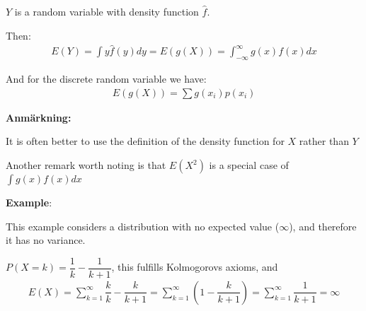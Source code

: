 \par\bigskip
\noindent $Y$ is a random variable with density function $\hat{f}$.\par
\noindent Then:
\begin{equation*}
  \begin{gathered}
    E(Y) = \int y \hat{f}(y)dy = E(g(X)) = \int_{-\infty}^{\infty}g(x)f(x)dx
  \end{gathered}
\end{equation*}
\par\bigskip
\noindent And for the discrete random variable we have:
\begin{equation*}
  \begin{gathered}
    E(g(X)) = \sum g(x_i)p(x_i)
  \end{gathered}
\end{equation*}
\par\bigskip
\noindent\textbf{Anmärkning:}\par
\noindent It is often better to use the definition of the density function for $X$ rather than $Y$ 
\par\bigskip
\noindent Another remark worth noting is that $E(X^2)$ is a special case of $\int g(x)f(x)dx$
\par\bigskip
\noindent\textbf{Example}:\par
\noindent This example considers a distribution with no expected value ($\infty$), and therefore it has no variance.\par
\noindent $P(X=k) = \dfrac{1}{k}-\dfrac{1}{k+1}$, this fulfills Kolmogorovs axioms, and
\begin{equation*}
  \begin{gathered}
    E(X)=\sum_{k=1}^{\infty}\dfrac{k}{k}-\dfrac{k}{k+1} = \sum_{k=1}^{\infty}\left(1-\dfrac{k}{k+1}\right) = \sum_{k=1}^{\infty}\dfrac{1}{k+1} = \infty
  \end{gathered}
\end{equation*}
